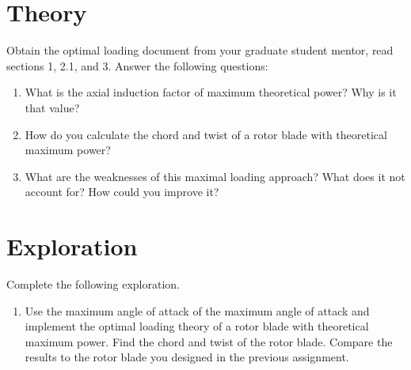 \documentclass[11pt,twocolumn]{article}
\begin{document}
\newpage



\section{Theory}
\label{sec:theory}

Obtain the optimal loading document from your graduate student mentor, read sections 1, 2.1, and 3. Answer the following questions:

\begin{enumerate}[label=\roman*.]
	\item What is the axial induction factor of maximum theoretical power? Why is it that value?
	\item How do you calculate the chord and twist of a rotor blade with theoretical maximum power? 
	\item What are the weaknesses of this maximal loading approach? What does it not account for? How could you improve it? 
\end{enumerate}


\section{Exploration}
\label{sec:exploration}

Complete the following exploration.


\begin{enumerate}[label=\roman*.]
	\item Use the maximum angle of attack of the maximum angle of attack and implement the optimal loading theory of a rotor blade with theoretical maximum power. Find the chord and twist of the rotor blade. Compare the results to the rotor blade you designed in the previous assignment.
\end{enumerate}
\end{document}
